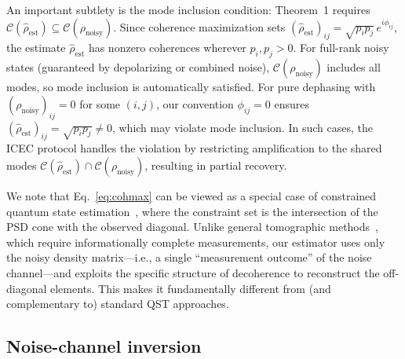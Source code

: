 \documentclass[prx,twocolumn,superscriptaddress,longbibliography,floatfix]{revtex4-2}
\newcommand{\CC}{\mathcal{C}}
\newcommand{\rhon}{\rho_\mathrm{noisy}}
\newcommand{\rhoe}{\hat{\rho}_\mathrm{est}}
\begin{document}
An important subtlety is the mode inclusion condition: Theorem~1 requires $\CC(\rhoe) \subseteq \CC(\rhon)$.
Since coherence maximization sets $(\rhoe)_{ij} = \sqrt{p_i p_j}\,e^{i\phi_{ij}}$, the estimate $\rhoe$ has nonzero coherences wherever $p_i, p_j > 0$.
For full-rank noisy states (guaranteed by depolarizing or combined noise), $\CC(\rhon)$ includes all modes, so mode inclusion is automatically satisfied.
For pure dephasing with $(\rhon)_{ij} = 0$ for some $(i,j)$, our convention $\phi_{ij} = 0$ ensures $(\rhoe)_{ij} = \sqrt{p_i p_j} \neq 0$, which may violate mode inclusion.
In such cases, the ICEC protocol handles the violation by restricting amplification to the shared modes $\CC(\rhoe) \cap \CC(\rhon)$, resulting in partial recovery.

We note that Eq.~\eqref{eq:cohmax} can be viewed as a special case of constrained quantum state estimation~\cite{Hradil1997}, where the constraint set is the intersection of the PSD cone with the observed diagonal.
Unlike general tomographic methods~\cite{Gross2010,Haah2017}, which require informationally complete measurements, our estimator uses only the noisy density matrix---i.e., a single ``measurement outcome'' of the noise channel---and exploits the specific structure of decoherence to reconstruct the off-diagonal elements.
This makes it fundamentally different from (and complementary to) standard QST approaches.

\subsection{Noise-channel inversion}
\label{sec:inversion}
\end{document}
